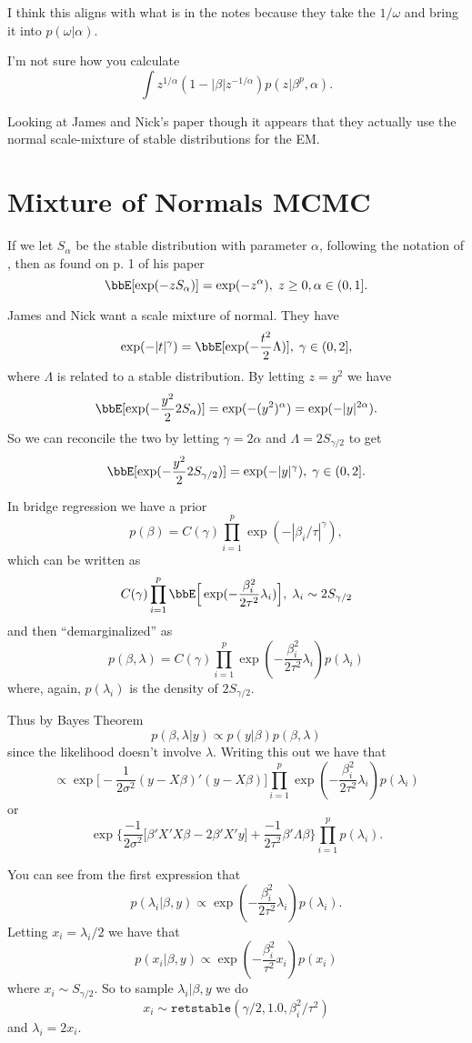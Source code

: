 \documentclass{article}
\begin{document}
I think this aligns with what is in the notes because they take the $1/\omega$
and bring it into $p(\omega | \alpha)$.

I'm not sure how you calculate
\[
\int z^{1/\alpha} (1 - |\beta| z^{-1/\alpha}) p(z | \beta^p, \alpha).
\]

Looking at James and Nick's paper though it appears that they actually use the
normal scale-mixture of stable distributions for the EM.

\section*{Mixture of Normals MCMC}

If we let $S_\alpha$ be the stable distribution with parameter $\alpha$,
following the notation of \cite{devroye-2009}, then as found on p. 1 of his
paper
\[
\bbE[\exp(-z S_\alpha)] = \exp(-z^\alpha), \; z \geq 0, \alpha \in (0, 1].
\]

James and Nick want a scale mixture of normal.  They have
\[
\exp(-|t|^\gamma) = \bbE[ \exp(-\frac{t^2}{2} \Lambda) ], \; \gamma \in (0, 2],
\]
where $\Lambda$ is related to a stable distribution.  By letting $z = y^2$ we
have
\[
\bbE[\exp(-\frac{y^2}{2} 2 S_\alpha)] = \exp(-(y^2)^\alpha)
= \exp( - |y|^{2 \alpha} ).
\]
So we can reconcile the two by letting $\gamma = 2 \alpha$ and $\Lambda = 2
S_{\gamma / 2}$ to get
\[
\bbE[\exp(-\frac{y^2}{2} 2 S_{\gamma / 2})] = \exp( - |y|^{\gamma} ), \; \gamma
\in (0, 2].
\]

In bridge regression we have a prior
\[
p(\beta) = C(\gamma) \prod_{i=1}^p \exp (- |\beta_i / \tau|^\gamma ),
\]
which can be written as
\[
C(\gamma) \prod_{i=1}^p \bbE \Big[ \exp( - \frac{\beta_i^2}{2 \tau^2}
\lambda_i ) \Big], \; \lambda_i \sim 2 S_{\gamma / 2}
\]
and then ``demarginalized'' as
\[
p(\beta, \lambda) = C(\gamma) 
\prod_{i=1}^p \exp(- \frac{\beta_i^2}{2 \tau^2} \lambda_i) p(\lambda_i)
\]
where, again, $p(\lambda_i)$ is the density of $2 S_{\gamma/2}$.

Thus by Bayes Theorem
\[
p(\beta, \lambda | y) \propto p(y | \beta) p(\beta, \lambda)
\]
since the likelihood doesn't involve $\lambda$.  Writing this out we have that
\[
\propto
\exp \Big[ -\frac{1}{2 \sigma^2} (y - X \beta)'(y - X \beta) \Big]
\prod_{i=1}^p \exp(- \frac{\beta_i^2}{2 \tau^2} \lambda_i) p(\lambda_i)
\]
or
\[
\exp \Big\{ \frac{-1}{2 \sigma^2} \Big[ \beta' X'X \beta - 2 \beta' X' y \Big]
+ \frac{-1}{2 \tau^2} \beta' \Lambda \beta \Big\} \prod_{i=1}^p p(\lambda_i).
\]

You can see from the first expression that
\[
p(\lambda_i | \beta, y) \propto \exp(- \frac{\beta_i^2}{2 \tau^2} \lambda_i) p(\lambda_i).
\]
Letting $x_i = \lambda_i / 2$ we have that
\[
p(x_i | \beta, y) \propto \exp(- \frac{\beta_i^2}{\tau^2} x_i) p(x_i)
\]
where $x_i \sim S_{\gamma / 2}$.  So to sample $\lambda_i | \beta, y$ we do
\[
x_i \sim \texttt{retstable}(\gamma / 2, 1.0, \beta_i^2 / \tau^2)
\]
and $\lambda_i = 2 x_i$.
\end{document}
